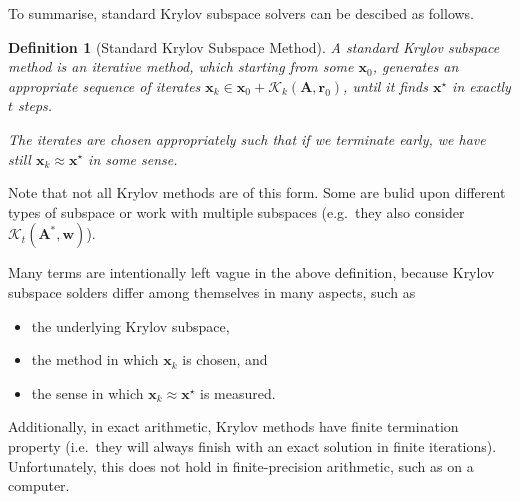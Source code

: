 \documentclass[12pt,a4paper]{article} %
\newtheorem*{definition}{Definition}
\begin{document}
To summarise, standard Krylov subspace solvers can be descibed as follows.
\begin{definition}[Standard Krylov Subspace Method]
    A standard Krylov subspace method is an {iterative method}, 
    which starting from some $\bm x_0$, 
    generates an appropriate sequence of iterates 
    $\bm x_k \in \bm x_0 + \mathcal K_k (\mathbf A, \bm r_0)$, 
    until it finds $\bm x^\star$ in exactly $t$ steps.

    The iterates are chosen appropriately such that if we terminate
    early, we have still $\bm x_k \approx \bm x^\star$ in some sense.
\end{definition}
Note that not all Krylov methods are of this form. Some are bulid upon 
different types of subspace or work with multiple subspaces (e.g.\ they 
also consider $\mathcal K_t (\mathbf A^*, \bm w)$).

Many terms are intentionally left vague in the above definition, because 
Krylov subspace solders differ among themselves in many aspects, such as 
\begin{itemize}
    \item the underlying Krylov subspace, 
    \item the method in which $\bm x_k$ is chosen, and
    \item the sense in which $\bm x_k \approx \bm x^\star$ is measured.
\end{itemize}
Additionally, in exact arithmetic, Krylov methods have finite termination property 
(i.e.\ they will always finish with an exact solution in finite iterations). 
Unfortunately, this does not hold in finite-precision
 arithmetic, such as on a computer.
\end{document}
